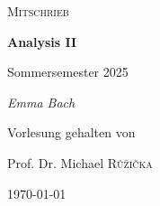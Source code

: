 \begin{titlepage}
	\centering
	{\Large \textsc{Mitschrieb}\par}
	\vspace{0.5cm}
	{\huge\bfseries Analysis II\par}
	\vspace{1cm}
    {\Large Sommersemester 2025\par}
    \vspace{1cm}
	{\Large\itshape Emma Bach\par}
	\vfill
	Vorlesung gehalten von\par
	Prof. Dr. Michael  \textsc{Růžička}

	\vfill

	{\large \today\par}
\end{titlepage}
